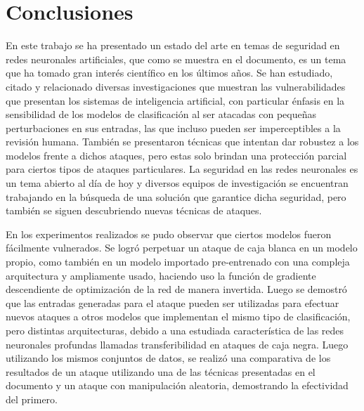 

\chapter{Conclusiones} %

\label{Conclusiones} %

En este trabajo se ha presentado un estado del arte en temas de seguridad en redes neuronales artificiales, que como se muestra en el documento, es un tema que ha tomado gran interés científico en los últimos años. Se han estudiado, citado y relacionado diversas investigaciones que muestran las vulnerabilidades que presentan los sistemas de inteligencia artificial, con particular énfasis en la sensibilidad de los modelos de clasificación al ser atacadas con pequeñas perturbaciones en sus entradas, las que incluso pueden ser imperceptibles a la revisión humana. También se presentaron técnicas que intentan dar robustez a los modelos frente a dichos ataques, pero estas solo brindan una protección parcial para ciertos tipos de ataques particulares. La seguridad en las redes neuronales es un tema abierto al día de hoy y diversos equipos de investigación se encuentran trabajando en la búsqueda de una solución que garantice dicha seguridad, pero también se siguen descubriendo nuevas técnicas de ataques.

En los experimentos realizados se pudo observar que ciertos modelos fueron fácilmente vulnerados. Se logró perpetuar un ataque de caja blanca en un modelo propio, como también en un modelo importado pre-entrenado con una compleja arquitectura y ampliamente usado, haciendo uso la función de gradiente descendiente de optimización de la red de manera invertida. Luego se demostró que las entradas generadas para el ataque pueden ser utilizadas para efectuar nuevos ataques a otros modelos que implementan el mismo tipo de clasificación, pero distintas arquitecturas, debido a una estudiada característica de las redes neuronales profundas llamadas transferibilidad en ataques de caja negra. Luego utilizando los mismos conjuntos de datos, se realizó una comparativa de los resultados de un ataque utilizando una de las técnicas presentadas en el documento y un ataque con manipulación aleatoria, demostrando la efectividad del primero.

